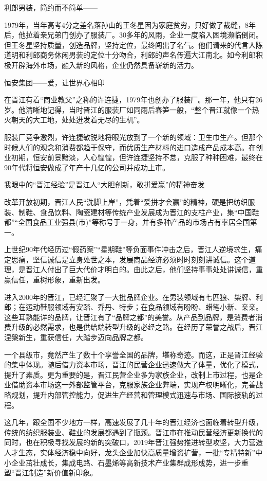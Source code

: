 \documentclass[]{book}
\begin{document}
利郎男装，简约而不简单------

1979年，当年高考4分之差名落孙山的王冬星因为家庭贫穷，只好做了裁缝，8年后，他拉着亲兄弟门创办了服装厂。30多年的风雨，企业一度陷入困境濒临倒闭。但王冬星坚持质量，创造品牌，坚持定位，最终闯出了名气。他们请来的代言人陈道明和利郎商务休闲男装的定位十分吻合，利郎的声名传遍大江南北。如今利郎积极开辟海外市场，融入新的风格，企业仍然具备崭新的活力。

恒安集团------爱，让世界心相印

在晋江有着``商业教父''之称的许连捷，1979年也创办了服装厂。那一年，他只有26岁。他清晰地记得，当时晋江的服装厂如同雨后春笋一般，``整个晋江就像一个热火朝天的大工地，处处迸发着无尽的生机''。

服装厂竞争激烈，许连捷敏锐地将眼光放到了一个新的领域：卫生巾生产。但那个时候人们的观念和消费都趋于保守，而优质生产材料的进口造成产品成本高。在创业初期，恒安前景黯淡，人心惶惶，但许连捷坚持不怠，克服了种种困难，最终在90年代将恒安做成了年产十几亿的公司并成功上市。

我眼中的``晋江经验''是晋江人``大胆创新，敢拼爱赢''的精神奋发

改革开放初期，晋江人民``洗脚上岸''，凭着``爱拼才会赢''的精神，硬是把纺织服装、制鞋、食品饮料、陶瓷建材等传统产业发展成为晋江的支柱产业，集``中国鞋都''``全国食品工业强县(市)''等称号于一身，并有多种产品的市场占有率居全国第一。

上世纪90年代经历过``假药案''``星期鞋''等负面事件冲击之后，晋江人逆境求生，痛定思痛，坚信诚信是立身处世之本，发展商品经济必须时时刻刻讲诚信。这个道理，是晋江人付出了巨大代价才明白的。由此之后，他们坚持事事处处讲诚信，重赢信任，重树形象，重新出发。

进入2000年的晋江，已经汇聚了一大批品牌企业。在男装领域有七匹狼、柒牌、利郎；在运动鞋服领域有安踏、乔丹、特步；在食品领域有盼盼、蜡笔小新、亲亲。这些耳熟能详的品牌，让晋江有了``品牌之都''的美誉。从产品到品牌，是消费者消费升级的必然需求，也是供给端转型升级的必经之路。在经历了荣誉之战后，晋江涅槃新生，重获信任，大踏步迈向品牌之都。

一个县级市，竟然产生了数十个享誉全国的品牌，堪称奇迹。而这，正是晋江经验的集中体现。随后借力资本市场，晋江的民营企业迅速做大了体量，优化了模式，提升了素质。更为重要的是，晋江民营企业多为家族企业，改制上市过程，也是企业借助资本市场这一外部监管平台，克服家族企业弊端，实现产权明晰化，完善战略规划，提升内部管控能力，促进生产经营和管理模式迅速与市场、国际接轨的过程。

这几年，跟全国不少地方一样，高速发展了几十年的晋江经济也面临着转型升级，传统的纺织服装业、鞋业的发展都遇到了瓶颈。晋江市在推动民营经济更新换代的同时，也在积极寻找发展的新的突破口，2019年晋江强势推进转型攻坚，大力营造人才生态，实体经济稳中向好，龙头企业加快高质量增资扩营，一批``专精特新''中小企业茁壮成长，集成电路、石墨烯等高新技术产业集群成形成势，进一步重塑``晋江制造''新价值新印象。
\end{document}
